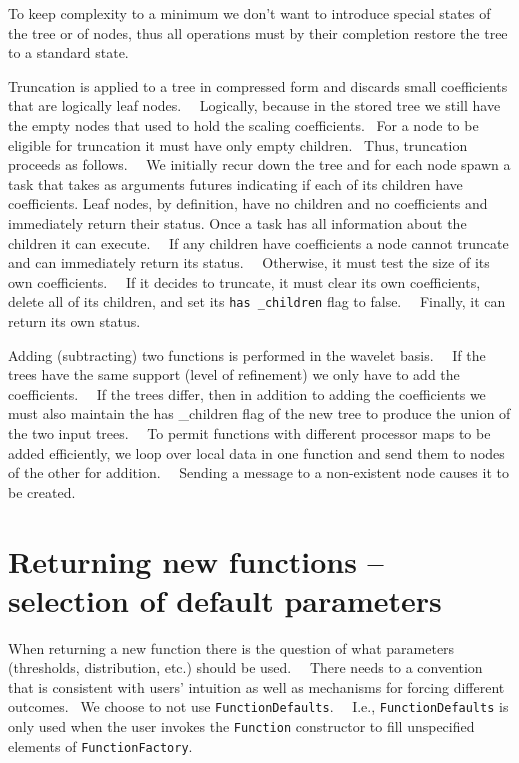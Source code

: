 \documentclass[letterpaper]{book}
\begin{document}
To keep complexity to a minimum we don't want to introduce special states of the tree or of nodes, thus all operations
must by their completion restore the tree to a standard state.

Truncation is applied to a tree in compressed form and discards small coefficients that are logically leaf nodes.
\ \ Logically, because in the stored tree we still have the empty nodes that used to hold the scaling coefficients.
\ For a node to be eligible for truncation it must have only empty children. \ Thus, truncation proceeds as follows.
\ \ We initially recur down the tree and for each node spawn a task that takes as arguments futures indicating if each
of its children have coefficients. Leaf nodes, by definition, have no children and no coefficients and immediately
return their status. Once a task has all information about the children it can execute. \ \ If any children have
coefficients a node cannot truncate and can immediately return its status. \ \ Otherwise, it must test the size of its
own coefficients. \ \ If it decides to truncate, it must clear its own coefficients, delete all of its children, and
set its \texttt{has \_children} flag to false. \ \ Finally, it can return its own status.

Adding (subtracting) two functions is performed in the wavelet basis. \ \ If the trees have the same support (level of
refinement) we only have to add the coefficients. \ \ If the trees differ, then in addition to adding the coefficients
we must also maintain the has \_children flag of the new tree to produce the union of the two input trees. \ \ To
permit functions with different processor maps to be added efficiently, we loop over local data in one function and
send them to nodes of the other for addition. \ \ Sending a message to a non-existent node causes it to be created.

\section[Returning new functions {}-- selection of default parameters]{Returning new functions -- selection of default
parameters}
When returning a new function there is the question of what parameters (thresholds, distribution, etc.) should be used.
\ \ There needs to a convention that is consistent with users' intuition as well as mechanisms for forcing different
outcomes. \ We choose to not use \texttt{FunctionDefaults}. \ \ I.e., \texttt{FunctionDefaults} is only used when the
user invokes the \texttt{Function} constructor to fill unspecified elements of \texttt{FunctionFactory}.
\end{document}
